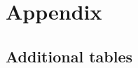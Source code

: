 \documentclass[12pt,english]{article}
\begin{document}
\listoftables
\listoffigures

\appendix %
\renewcommand{\thetable}{A\arabic{table}}
\renewcommand{\thefigure}{A\arabic{figure}}
\setcounter{figure}{0}
\setcounter{table}{0}

\clearpage
\section{Appendix}


\subsection{Additional tables}
% 
\end{document}
